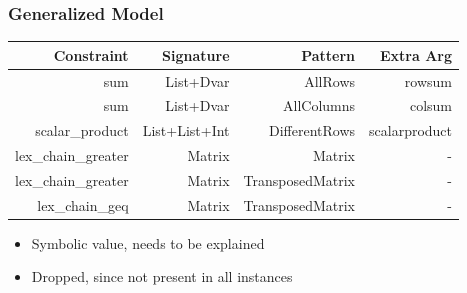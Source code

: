 \begin{frame}
\frametitle{Generalized Model}
\begin{tabular}{rrrr}\toprule
Constraint & Signature & Pattern & Extra Arg \\ \midrule
sum & List+Dvar & AllRows & \cellcolor{insight-royalblue!20}rowsum \\
sum & List+Dvar & AllColumns & \cellcolor{insight-royalblue!20}colsum \\
scalar\_product & List+List+Int & DifferentRows & \cellcolor{insight-royalblue!20}scalarproduct\\
lex\_chain\_greater & Matrix & Matrix & - \\
\rowcolor{insight-burntorange!30}lex\_chain\_greater & Matrix & TransposedMatrix & -  \\
lex\_chain\_geq & Matrix & TransposedMatrix & - \\
\bottomrule
\end{tabular}

\begin{itemize}
\item \textcolor{insight-royalblue}{Symbolic value, needs to be explained}

\item \textcolor{insight-burntorange}{Dropped, since not present in all instances}
\end{itemize}
\end{frame}


